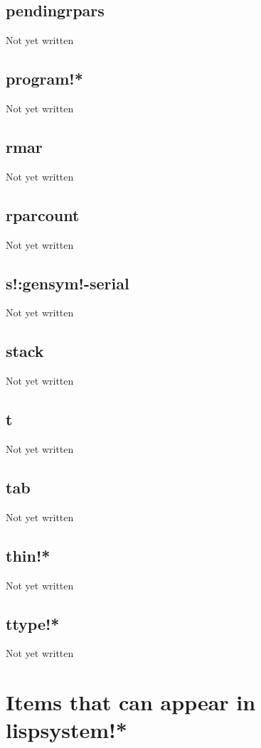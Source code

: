 \documentclass[a4paper,11pt]{article}
\begin{document}
\subsection{\ttfamily pendingrpars}
Not yet written

\subsection{\ttfamily program!*}
Not yet written

\subsection{\ttfamily rmar}
Not yet written

\subsection{\ttfamily rparcount}
Not yet written

\subsection{\ttfamily s!:gensym!-serial}
Not yet written

\subsection{\ttfamily stack}
Not yet written

\subsection{\ttfamily t}
Not yet written

\subsection{\ttfamily tab}
Not yet written

\subsection{\ttfamily thin!*}
Not yet written

\subsection{\ttfamily ttype!*}
Not yet written




\section{Items that can appear in {\ttfamily lispsystem!*}}
\end{document}
